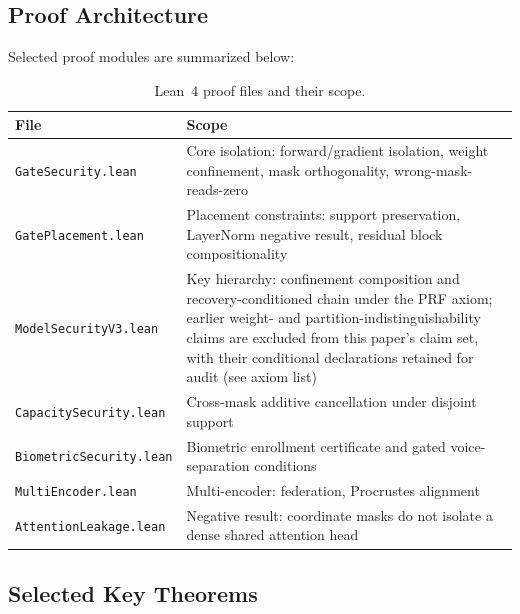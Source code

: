 \documentclass[11pt,a4paper]{article}
\begin{document}
\subsection{Proof Architecture}

Selected proof modules are summarized below:

\begin{table}[ht]
\centering
\caption{Lean~4 proof files and their scope.}
\label{tab:proof-files}
\begin{tabular}{@{}p{4.5cm}p{8.5cm}@{}}
\toprule
\textbf{File} & \textbf{Scope} \\
\midrule
\texttt{GateSecurity.lean} &
Core isolation: forward/gradient isolation, weight confinement,
mask orthogonality, wrong-mask-reads-zero \\
\texttt{GatePlacement.lean} &
Placement constraints: support preservation, LayerNorm negative
result, residual block compositionality \\
\texttt{ModelSecurityV3.lean} &
Key hierarchy: confinement composition and recovery-conditioned
chain under the PRF axiom; earlier weight- and
partition-indistinguishability claims are excluded from this paper's claim
set, with their conditional declarations retained for audit (see axiom list) \\
\texttt{CapacitySecurity.lean} &
Cross-mask additive cancellation under disjoint support \\
\texttt{BiometricSecurity.lean} &
Biometric enrollment certificate and gated voice-separation conditions \\
\texttt{MultiEncoder.lean} &
Multi-encoder: federation, Procrustes alignment \\
\texttt{AttentionLeakage.lean} &
Negative result: coordinate masks do not isolate a dense shared
attention head \\
\bottomrule
\end{tabular}
\end{table}

\subsection{Selected Key Theorems}
\end{document}
